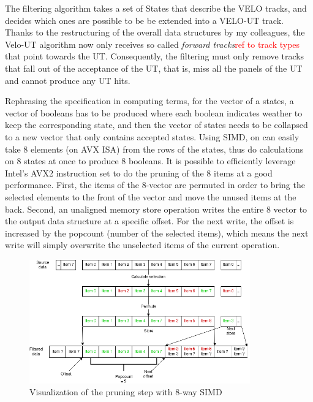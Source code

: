 \documentclass[12pt]{article}
\begin{document}
The filtering algorithm takes a set of States that describe the VELO tracks, and decides which ones are possible to be be extended into a VELO-UT track. Thanks to the restructuring of the overall data structures by my colleagues, the Velo-UT algorithm now only receives so called \textit{forward tracks}\textcolor{red}{ref to track types} that point towards the UT. Consequently, the filtering must only remove tracks that fall out of the acceptance of the UT, that is, miss all the panels of the UT and cannot produce any UT hits.

Rephrasing the specification in computing terms, for the vector of a states, a vector of booleans has to be produced where each boolean indicates weather to keep the corresponding state, and then the vector of states needs to be collapsed to a new vector that only contains accepted states. Using SIMD, on can easily take 8 elements (on AVX ISA) from the rows of the states, thus do calculations on 8 states at once to produce 8 booleans. It is possible to efficiently leverage Intel's AVX2 instruction set to do the pruning of the 8 items at a good performance\cite{lemire_simd_prune}. First, the items of the 8-vector are permuted in order to bring the selected elements to the front of the vector and move the unused items at the back. Second, an unaligned memory store operation writes the entire 8 vector to the output data structure at a specific offset. For the next write, the offset is increased by the popcount (number of the selected items), which means the next write will simply overwrite the unselected items of the current operation.

\begin{figure}[H]
	\begin{center}
		\includegraphics[width=0.85\textwidth]{velout_opt_simd_filter}
	\end{center}
	\caption{Visualization of the pruning step with 8-way SIMD}
	\label{fig_velout_opt_simd_filter}
\end{figure}
\end{document}
